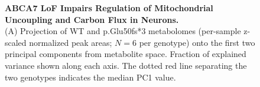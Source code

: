 \begin{figure}[ht]
    \caption{
        \textbf{ABCA7 LoF Impairs Regulation of Mitochondrial Uncoupling and Carbon Flux in Neurons.}\\[1ex]
        (A) Projection of WT and p.Glu50fs*3 metabolomes (per-sample z-scaled normalized peak areas; $N=6$ per genotype) onto the first two principal components from metabolite space. Fraction of explained variance shown along each axis. The dotted red line separating the two genotypes indicates the median PC1 value. 
}
\end{figure}
